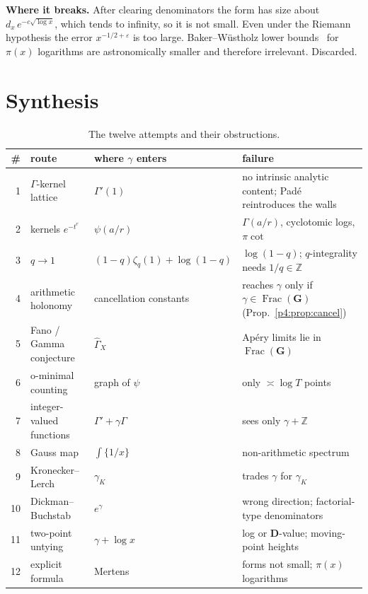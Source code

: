 \documentclass[11pt,a4paper]{article}
\theoremstyle{definition}
\theoremstyle{remark}
\newcommand{\Z}{\mathbb Z}
\newcommand{\bG}{\mathbf G}
\newcommand{\bD}{\mathbf D}
\DeclareMathOperator{\Frac}{Frac}
\numberwithin{equation}{section}
\begin{document}
\noindent\textbf{Where it breaks.} After clearing denominators the form has size about $d_x\,e^{-c\sqrt{\log x}}$, which tends to infinity, so it is not small. Even under the Riemann hypothesis the error $x^{-1/2+\varepsilon}$ is too large. Baker--W\"ustholz lower bounds~\cite{p4:BW} for $\pi(x)$ logarithms are astronomically smaller and therefore irrelevant. Discarded.

\section{Synthesis}\label{p4:sec:synthesis}

\begin{table}[ht]
\centering
\small
\begin{tabular}{rl>{\raggedright\arraybackslash}p{3.6cm}>{\raggedright\arraybackslash}p{5.4cm}}
\toprule
\# & route & where $\gamma$ enters & failure\\
\midrule
1 & $\Gamma$-kernel lattice & $\Gamma'(1)$ & no intrinsic analytic content; Pad\'e reintroduces the walls\\
2 & kernels $e^{-t^r}$ & $\psi(a/r)$ & $\Gamma(a/r)$, cyclotomic logs, $\pi\cot$\\
3 & $q\to1$ & $(1-q)\zeta_q(1)+\log(1-q)$ & $\log(1-q)$; $q$-integrality needs $1/q\in\Z$\\
4 & arithmetic holonomy & cancellation constants & reaches $\gamma$ only if $\gamma\in\Frac(\bG)$ (Prop.~\ref{p4:prop:cancel})\\
5 & Fano / Gamma conjecture & $\widehat\Gamma_X$ & Ap\'ery limits lie in $\Frac(\bG)$\\
6 & o-minimal counting & graph of $\psi$ & only $\asymp\log T$ points\\
7 & integer-valued functions & $\Gamma'+\gamma\Gamma$ & sees only $\gamma+\Z$\\
8 & Gauss map & $\int\{1/x\}$ & non-arithmetic spectrum\\
9 & Kronecker--Lerch & $\gamma_K$ & trades $\gamma$ for $\gamma_K$\\
10 & Dickman--Buchstab & $e^{\gamma}$ & wrong direction; factorial-type denominators\\
11 & two-point untying & $\gamma+\log x$ & log or $\bD$-value; moving-point heights\\
12 & explicit formula & Mertens & forms not small; $\pi(x)$ logarithms\\
\bottomrule
\end{tabular}
\caption{The twelve attempts and their obstructions.}\label{p4:tab:synth}
\end{table}
\end{document}
